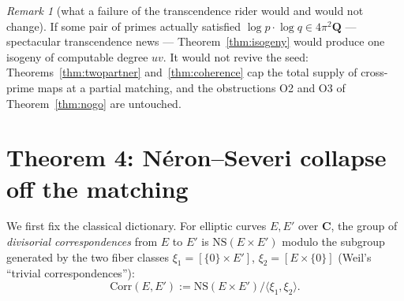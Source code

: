 \documentclass[11pt]{article}
\theoremstyle{definition}
\theoremstyle{remark}
\newtheorem{remark}{Remark}
\newcommand{\Q}{\mathbf{Q}}
\newcommand{\C}{\mathbf{C}}
\newcommand{\NS}{\mathrm{NS}}
\newcommand{\Corr}{\mathrm{Corr}}
\begin{document}
\begin{remark}[what a failure of the transcendence rider would and would not
change]
\label{rem:failure}
If some pair of primes actually satisfied
$\log p\cdot\log q \in 4\pi^2\Q$ --- spectacular transcendence news ---
Theorem~\ref{thm:isogeny} would produce one isogeny of computable degree
$uv$. It would not revive the seed: Theorems~\ref{thm:twopartner}
and~\ref{thm:coherence} cap the total supply of cross-prime maps at a
partial matching, and the obstructions O2 and O3 of Theorem~\ref{thm:nogo}
are untouched.
\end{remark}

\section{Theorem 4: N\'eron--Severi collapse off the matching}
\label{sec:NS}

We first fix the classical dictionary. For elliptic curves $E, E'$ over
$\C$, the group of \emph{divisorial correspondences} from $E$ to $E'$ is
$\NS(E \times E')$ modulo the subgroup generated by the two fiber classes
$\xi_1 = [\{0\}\times E']$, $\xi_2 = [E\times\{0\}]$ (Weil's ``trivial
correspondences''):
\[
\Corr(E, E') := \NS(E \times E') / \langle \xi_1, \xi_2 \rangle .
\]
\end{document}
